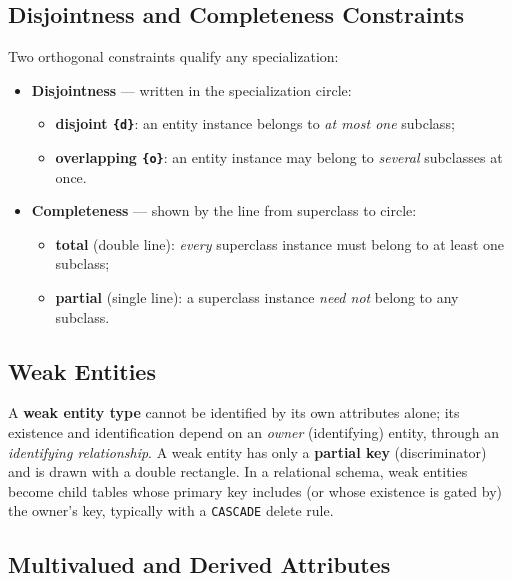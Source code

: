 \documentclass[11pt,a4paper]{article}
\begin{document}
\subsection{Disjointness and Completeness Constraints}

Two orthogonal constraints qualify any specialization:

\begin{itemize}[leftmargin=1.4em]
  \item \textbf{Disjointness} --- written in the specialization circle:
        \begin{itemize}[leftmargin=1.4em]
          \item \textbf{disjoint \texttt{\{d\}}}: an entity instance belongs to
                \emph{at most one} subclass;
          \item \textbf{overlapping \texttt{\{o\}}}: an entity instance may
                belong to \emph{several} subclasses at once.
        \end{itemize}
  \item \textbf{Completeness} --- shown by the line from superclass to circle:
        \begin{itemize}[leftmargin=1.4em]
          \item \textbf{total} (double line): \emph{every} superclass instance
                must belong to at least one subclass;
          \item \textbf{partial} (single line): a superclass instance \emph{need
                not} belong to any subclass.
        \end{itemize}
\end{itemize}

\subsection{Weak Entities}

A \textbf{weak entity type} cannot be identified by its own attributes alone; its
existence and identification depend on an \emph{owner} (identifying) entity,
through an \emph{identifying relationship}. A weak entity has only a
\textbf{partial key} (discriminator) and is drawn with a double rectangle. In a
relational schema, weak entities become child tables whose primary key includes
(or whose existence is gated by) the owner's key, typically with a
\texttt{CASCADE} delete rule.

\subsection{Multivalued and Derived Attributes}
\end{document}
